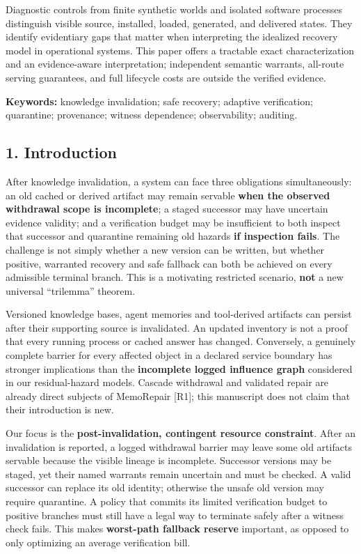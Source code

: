\documentclass[
  10pt,
  american,
  a4paper,
]{article}
\begin{document}
Diagnostic controls from finite synthetic worlds and isolated software
processes distinguish visible source, installed, loaded, generated, and
delivered states. They identify evidentiary gaps that matter when
interpreting the idealized recovery model in operational systems. This
paper offers a tractable exact characterization and an evidence-aware
interpretation; independent semantic warrants, all-route serving
guarantees, and full lifecycle costs are outside the verified evidence.

\textbf{Keywords:} knowledge invalidation; safe recovery; adaptive
verification; quarantine; provenance; witness dependence; observability;
auditing.

\hypertarget{introduction}{%
\subsection{1. Introduction}\label{introduction}}

After knowledge invalidation, a system can face three obligations
simultaneously: an old cached or derived artifact may remain servable
\textbf{when the observed withdrawal scope is incomplete}; a staged
successor may have uncertain evidence validity; and a verification
budget may be insufficient to both inspect that successor and quarantine
remaining old hazards \textbf{if inspection fails}. The challenge is not
simply whether a new version can be written, but whether positive,
warranted recovery and safe fallback can both be achieved on every
admissible terminal branch. This is a motivating restricted scenario,
\textbf{not} a new universal ``trilemma'' theorem.

Versioned knowledge bases, agent memories and tool-derived artifacts can
persist after their supporting source is invalidated. An updated
inventory is not a proof that every running process or cached answer has
changed. Conversely, a genuinely complete barrier for every affected
object in a declared service boundary has stronger implications than the
\textbf{incomplete logged influence graph} considered in our
residual-hazard models. Cascade withdrawal and validated repair are
already direct subjects of MemoRepair {[}R1{]}; this manuscript does not
claim that their introduction is new.

Our focus is the \textbf{post-invalidation, contingent resource
constraint}. After an invalidation is reported, a logged withdrawal
barrier may leave some old artifacts servable because the visible
lineage is incomplete. Successor versions may be staged, yet their named
warrants remain uncertain and must be checked. A valid successor can
replace its old identity; otherwise the unsafe old version may require
quarantine. A policy that commits its limited verification budget to
positive branches must still have a legal way to terminate safely after
a witness check fails. This makes \textbf{worst-path fallback reserve}
important, as opposed to only optimizing an average verification bill.
\end{document}
